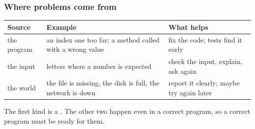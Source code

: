 \documentclass[aspectratio=169,10pt,compress]{beamer}
\begin{document}
\begin{frame}[t,fragile] \frametitle{Where problems come from}


\begin{table}
		\small
		\begin{tabular}{@{}L{0.16\textwidth}L{0.32\textwidth}L{0.42\textwidth}@{}}
			\toprule
			\textbf{Source} & \textbf{Example} & \textbf{What helps} \\
			\midrule
			the program  & an index one too far; a method called with a wrong value & fix the code; tests find it early \\
			the input    & letters where a number is expected                       & check the input, explain, ask again \\
			the world    & the file is missing, the disk is full, the network is down & report it clearly; maybe try again later \\
			\bottomrule
		\end{tabular}
\end{table}%


	\vspace{0.5em}
	\small The first kind is a . The other two happen even in a correct program, so a correct program
	must be ready for them.
\end{frame}
\end{document}
